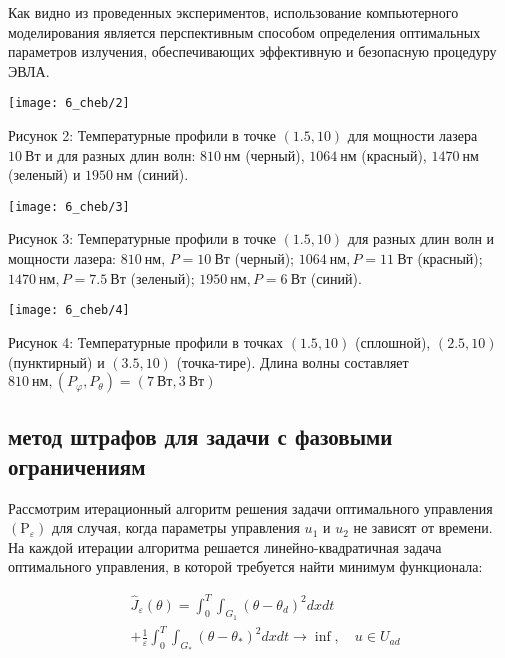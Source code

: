 Как видно из проведенных экспериментов, использование компьютерного
моделирования является перспективным способом определения оптимальных
параметров излучения, обеспечивающих эффективную и безопасную процедуру ЭВЛА.

\begin{center}
    \texttt{[image: 6\_cheb/2]}
\end{center}
Рисунок 2: Температурные профили в точке $(1.5,10)$ для мощности лазера
$10 \mathrm{~Вт}$ и для разных длин волн: $810 \mathrm{~нм}$ (черный),
$1064 \mathrm{~нм}$ (красный), $1470 \mathrm{~нм}$
(зеленый) и $1950 \mathrm{~нм}$ (синий).

\begin{center}
    \texttt{[image: 6\_cheb/3]}
\end{center}

Рисунок 3: Температурные профили в точке $(1.5,10)$ для разных
длин волн и мощности лазера: $810 \mathrm{~нм}$, $P=10 \mathrm{~Вт}$
(черный); $1064 \mathrm{~нм}, P=11 \mathrm{~Вт}$ (красный);
$1470 \mathrm{~нм}, P=7.5 \mathrm{~Вт}$ (зеленый);
$1950 \mathrm{~нм}, P=6 \mathrm{~Вт}$ (синий).

\begin{center}
    \texttt{[image: 6\_cheb/4]}
\end{center}

Рисунок 4: Температурные профили в точках $(1.5,10)$ (сплошной),
$(2.5,10)$ (пунктирный) и $(3.5,10)$ (точка-тире).
Длина волны составляет $810 \mathrm{~нм},\left(P_{\varphi},
P_{\theta}\right)=(7 \mathrm{~Вт}, 3 \mathrm{~Вт})$



\subsection{метод штрафов для задачи с фазовыми ограничениям}
\label{subsec:ch4/sec3/subsec5}


Рассмотрим итерационный алгоритм решения задачи оптимального управления
$\left(\mathrm{P}_{\varepsilon}\right)$ для случая, когда параметры управления
$u_{1}$ и $u_{2}$ не зависят от времени.
На каждой итерации алгоритма
решается линейно-квадратичная задача оптимального управления,
в которой требуется найти минимум функционала:

\begin{equation}
    \label{eq:3_2:9}
    \begin{aligned}
        &\widehat{J}_{\varepsilon}(\theta)=\int_{0}^{T}
        \int_{G_{1}}\left(\theta-\theta_{d}\right)^{2} d x d t \\
        &+\frac{1}{\varepsilon} \int_{0}^{T}
        \int_{G_{*}}\left(\theta-\theta_{*}\right)^{2} d x d t
        \rightarrow \inf , \quad u \in U_{a d}
    \end{aligned}
\end{equation}

